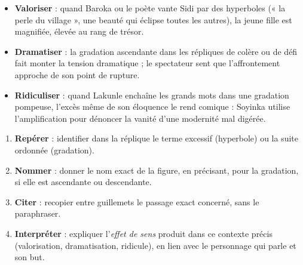\documentclass[11pt]{article}
\begin{document}
\begin{itemize}
\item \textbf{Valoriser} : quand Baroka ou le poète vante Sidi par des hyperboles (« la perle du village », une beauté qui éclipse toutes les autres), la jeune fille est magnifiée, élevée au rang de trésor.
\item \textbf{Dramatiser} : la gradation ascendante dans les répliques de colère ou de défi fait monter la tension dramatique ; le spectateur sent que l'affrontement approche de son point de rupture.
\item \textbf{Ridiculiser} : quand Lakunle enchaîne les grands mots dans une gradation pompeuse, l'excès même de son éloquence le rend comique : Soyinka utilise l'amplification pour dénoncer la vanité d'une modernité mal digérée.
\end{itemize}

\begin{methode}
\begin{enumerate}
\item \textbf{Repérer} : identifier dans la réplique le terme excessif (hyperbole) ou la suite ordonnée (gradation).
\item \textbf{Nommer} : donner le nom exact de la figure, en précisant, pour la gradation, si elle est ascendante ou descendante.
\item \textbf{Citer} : recopier entre guillemets le passage exact concerné, sans le paraphraser.
\item \textbf{Interpréter} : expliquer l'\emph{effet de sens} produit dans ce contexte précis (valorisation, dramatisation, ridicule), en lien avec le personnage qui parle et son but.
\end{enumerate}
\end{methode}
\end{document}

